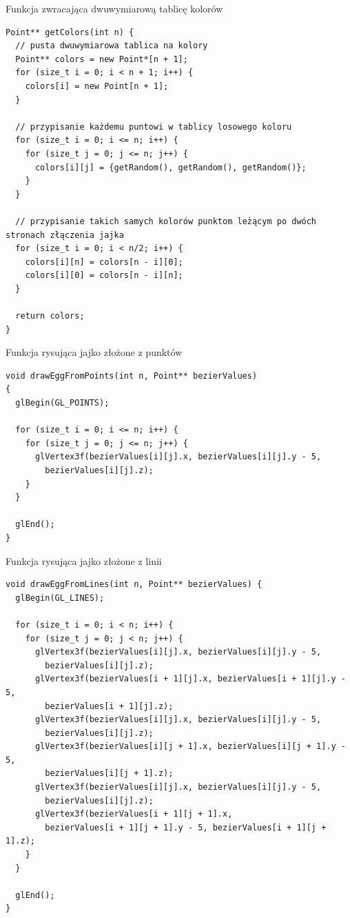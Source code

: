 \documentclass[12pt,a4paper,titlepage]{article}
\begin{document}
\begin{listing}[H]
\caption{Funkcja zwracająca dwuwymiarową tablicę kolorów}
\begin{verbatim}
Point** getColors(int n) {
  // pusta dwuwymiarowa tablica na kolory
  Point** colors = new Point*[n + 1];
  for (size_t i = 0; i < n + 1; i++) {
    colors[i] = new Point[n + 1];
  }

  // przypisanie każdemu puntowi w tablicy losowego koloru
  for (size_t i = 0; i <= n; i++) {
    for (size_t j = 0; j <= n; j++) {
      colors[i][j] = {getRandom(), getRandom(), getRandom()};
    }
  }

  // przypisanie takich samych kolorów punktom leżącym po dwóch stronach złączenia jajka
  for (size_t i = 0; i < n/2; i++) {
    colors[i][n] = colors[n - i][0];
    colors[i][0] = colors[n - i][n];
  }

  return colors;
}
\end{verbatim}
\end{listing}

\begin{listing}[H]
\caption{Funkcja rysująca jajko złożone z punktów}
\begin{verbatim}
void drawEggFromPoints(int n, Point** bezierValues)
{
  glBegin(GL_POINTS);

  for (size_t i = 0; i <= n; i++) {
    for (size_t j = 0; j <= n; j++) {
      glVertex3f(bezierValues[i][j].x, bezierValues[i][j].y - 5,
        bezierValues[i][j].z);
    }
  }

  glEnd();
}
\end{verbatim}
\end{listing}

\begin{listing}[H]
\caption{Funkcja rysująca jajko złożone z linii}
\begin{verbatim}
void drawEggFromLines(int n, Point** bezierValues) {
  glBegin(GL_LINES);

  for (size_t i = 0; i < n; i++) {
    for (size_t j = 0; j < n; j++) {
      glVertex3f(bezierValues[i][j].x, bezierValues[i][j].y - 5, 
        bezierValues[i][j].z);
      glVertex3f(bezierValues[i + 1][j].x, bezierValues[i + 1][j].y - 5, 
        bezierValues[i + 1][j].z);
      glVertex3f(bezierValues[i][j].x, bezierValues[i][j].y - 5, 
        bezierValues[i][j].z);
      glVertex3f(bezierValues[i][j + 1].x, bezierValues[i][j + 1].y - 5, 
        bezierValues[i][j + 1].z);
      glVertex3f(bezierValues[i][j].x, bezierValues[i][j].y - 5, 
        bezierValues[i][j].z);
      glVertex3f(bezierValues[i + 1][j + 1].x,
        bezierValues[i + 1][j + 1].y - 5, bezierValues[i + 1][j + 1].z);
    }
  }

  glEnd();
}
\end{verbatim}
\end{listing}
\end{document}
